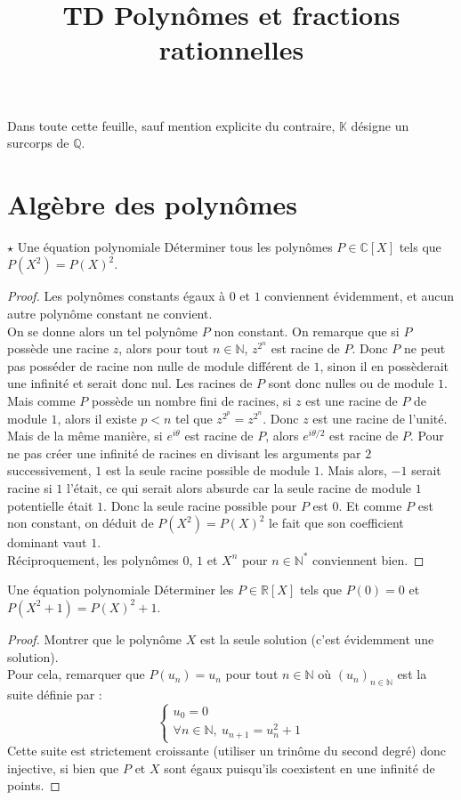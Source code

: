 \documentclass[french,a4paper]{article}
\title{TD Polynômes et fractions rationnelles}
\newcommand{\N}{\mathbb{N}}
\newcommand{\Q}{\mathbb{Q}}
\newcommand{\R}{\mathbb{R}}
\newcommand{\C}{\mathbb{C}}
\newcommand{\K}{\mathbb{K}}
\newcommand{\st}{^*}
\theoremstyle{plain}
\theoremstyle{definition}
\theoremstyle{remark}
\begin{document}
\maketitle

Dans toute cette feuille, sauf mention explicite du contraire, $\K$ désigne un surcorps de $\Q$.

\section{Algèbre des polynômes}

\begin{ex}{$\star$ Une équation polynomiale}
	Déterminer tous les polynômes $P\in\C[X]$ tels que $P(X^2)=P(X)^2$.
\end{ex}
\begin{proof}
	Les polynômes constants égaux à $0$ et $1$ conviennent évidemment, et aucun autre polynôme constant ne convient.\\ On se donne alors un tel polynôme $P$ non constant. On remarque que si $P$ possède une racine $z$, alors pour tout $n\in\N$, $z^{2^n}$ est racine de $P$. Donc $P$ ne peut pas posséder de racine non nulle de module différent de $1$, sinon il en possèderait une infinité et serait donc nul. Les racines de $P$ sont donc nulles ou de module $1$. Mais comme $P$ possède un nombre fini de racines, si $z$ est une racine de $P$ de module $1$, alors il existe $p<n$ tel que $z^{2^p}=z^{2^n}$. Donc $z$ est une racine de l'unité. Mais de la même manière, si $e^{i\theta}$ est racine de $P$, alors $e^{i\theta/2}$ est racine de $P$. Pour ne pas créer une infinité de racines en divisant les arguments par $2$ successivement, $1$ est la seule racine possible de module $1$. Mais alors, $-1$ serait racine si $1$ l'était, ce qui serait alors absurde car la seule racine de module $1$ potentielle était $1$. Donc la seule racine possible pour $P$ est $0$. Et comme $P$ est non constant, on déduit de $P(X^2)=P(X)^2$ le fait que son coefficient dominant vaut $1$. \\
	Réciproquement, les polynômes $0$, $1$ et $X^n$ pour $n\in\N\st$ conviennent bien.
\end{proof}

\begin{ex}{Une équation polynomiale}
	Déterminer les $P\in\R[X]$ tels que $P(0)=0$ et $P(X^2+1)=P(X)^2+1$.
\end{ex}
\begin{proof}
	Montrer que le polynôme $X$ est la seule solution (c'est évidemment une solution). \\
	Pour cela, remarquer que $P(u_n)=u_n$ pour tout $n\in\N$ où $(u_n)_{n\in\N}$ est la suite définie par : $$\begin{cases}
		u_0=0 \\
		\forall n\in\N,\ u_{n+1}=u_n^2+1
	\end{cases}$$ Cette suite est strictement croissante (utiliser un trinôme du second degré) donc injective, si bien que $P$ et $X$ sont égaux puisqu'ils coexistent en une infinité de points.
\end{proof}
\end{document}
